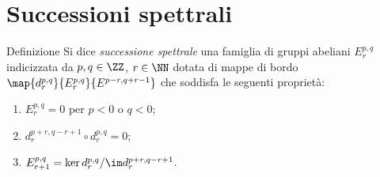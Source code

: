\section{Successioni spettrali}
\begin{frame}
\begin{block}{Definizione}
Si dice \emph{successione spettrale} una famiglia di gruppi abeliani \(E^{p,q}_r\) indicizzata da \(p,q\in\ZZ\), \(r\in\NN\) dotata di mappe di bordo \(\map{d^{p,q}_r}{E^{p,q}_r}{E^{p-r,q+r-1}}\) che soddisfa le seguenti proprietà:
\begin{enumerate}
\item \(E^{p,q}_r=0\) per \(p<0\) o \(q<0\);
\item \(d^{p+r,q-r+1}_r\circ d^{p,q}_r=0\);
\item \(E^{p,q}_{r+1}=\ker d^{p,q}_r/\im d^{p+r,q-r+1}_r\).
\end{enumerate}
\end{block}
\end{frame}
\begin{frame}
\begin{center}
\end{center}
\end{frame}